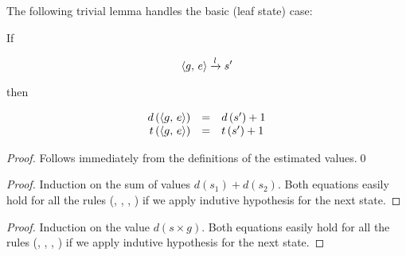 The following trivial lemma handles the basic (leaf state) case:

\begin{lemma}
\label{lem:task_measure_equations}
  If

  \[\langle g ,\, e \rangle \xrightarrow{l} s^\prime\]

  then

  \[
    \begin{array}{rcl}
    d\,(\langle g ,\, e \rangle) &=& d\,(s^\prime) + 1\\
    t\,(\langle g ,\, e \rangle) &=& t\,(s^\prime) + 1
    \end{array}
  \]
\end{lemma}
\begin{proof}
    Follows immediately from the definitions of the estimated values.\qed
\end{proof}


\begin{proof}
Induction on the sum of values $d(s_1) + d(s_2)$.
Both equations easily hold for all the rules (, , , ) if we apply indutive hypothesis for the next state.
\end{proof}

\begin{proof}
Induction on the value $d(s \times g)$. 
Both equations easily hold for all the rules (, , , ) if we apply indutive hypothesis for the next state.
\end{proof}

